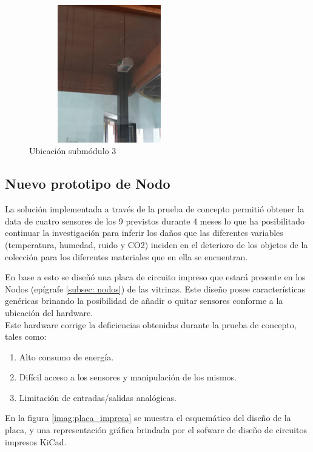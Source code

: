     \begin{figure}[H]
        \centering
        \includegraphics[width=7cm, height=6cm]{imagenes/submodulo 3.jpg}
        \caption{Ubicación submódulo 3}
        \label{imag:ubicacion_submodulo3}
    \end{figure}

    \subsection{Nuevo prototipo de Nodo} \label{subsec:nuevo_prototipo_nodo}

    La solución implementada a través de la prueba de concepto permitió obtener la data de cuatro sensores de los 9 previstos durante 4 meses lo que ha posibilitado continuar la investigación para inferir
    los daños que las diferentes variables (temperatura, humedad, ruido y CO2) inciden en el deterioro de los objetos de la colección para los diferentes materiales que en ella se encuentran.

    En base a esto se diseñó una placa de circuito impreso que estará presente en los Nodos (epígrafe \ref{subsec: nodos}) de las vitrinas.
    Este diseño posee características genéricas brinando la posibilidad de añadir o quitar sensores conforme a la ubicación del hardware.\\

    Este hardware corrige la deficiencias obtenidas durante la prueba de concepto, tales como:
      \begin{enumerate}
        \item Alto consumo de energía.
        \item Difícil acceso a los sensores y manipulación de los mismos.
        \item Limitación de entradas/salidas analógicas.
      \end{enumerate}

    En la figura \ref{imag:placa_impresa} se muestra el esquemático del diseño de la placa, y una representación gráfica brindada por el sofware de diseño de circuitos impresos KiCad.

